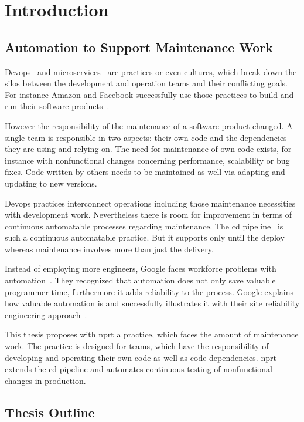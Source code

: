 \chapter{Introduction}
\label{chap:intro}
\section{Automation to Support Maintenance Work}

Devops~\cite{devops_definition} and microservices~\cite{microservices_fowler} are
practices or even cultures, which break down the silos between the development and
operation teams and their conflicting goals. For instance Amazon and Facebook successfully
use those practices to build and run their software products~\cite{build_run,dev_at_fb}.

However the responsibility of the maintenance of a software product changed. A single team
is responsible in two aspects: their own code and the dependencies they are using and
relying on. The need for maintenance of own code exists, for instance with nonfunctional
changes concerning performance, scalability or bug fixes. Code written by others needs to
be maintained as well via adapting and updating to new versions.

Devops practices interconnect operations including those maintenance necessities with
development work. Nevertheless there is room for improvement in terms of continuous
automatable processes regarding maintenance. The \gls{cd}
pipeline~\cite{cd_humble_pipeline} is such a continuous automatable practice. But it
supports only until the deploy whereas maintenance involves more than just the delivery.

Instead of employing more engineers, Google faces workforce problems with
automation~\cite{sre_automation}. They recognized that automation does not only save
valuable programmer time, furthermore it adds reliability to the process. Google explains
how valuable automation is and successfully illustrates it with their site reliability
engineering approach~\cite{sre_intro}.

This thesis proposes with \gls{nprt} a practice, which faces the amount of maintenance
work. The practice is designed for teams, which have the responsibility of developing and
operating their own code as well as code dependencies. \gls{nprt} extends the \gls{cd}
pipeline and automates continuous testing of nonfunctional changes in production.

\section{Thesis Outline}

